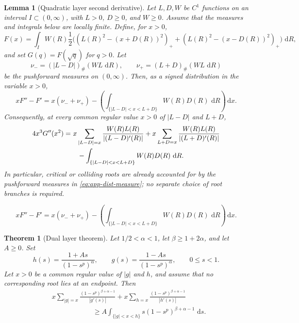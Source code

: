 \documentclass[10pt,a4paper]{amsart}
\newtheorem{theorem}{Theorem}
\newtheorem{lemma}{Lemma}
\newcommand{\dd}{\,\mathrm{d}}
\begin{document}
\begin{lemma}[Quadratic layer second derivative]\label{lem:app-second-dist}
Let $L,D,W$ be $C^1$ functions on an interval
$I\subset(0,\infty)$, with $L>0$, $D\ge0$, and $W\ge0$. Assume that
the measures and integrals below are locally finite. Define, for $x>0$,
\[
 F(x)=\int_I W(R)\frac12\Big(
 (L(R)^2-(x+D(R))^2)_+
 +(L(R)^2-(x-D(R))^2)_+
 \Big)\,\dd R,
\]
and set $G(q)=F(\sqrt q)$ for $q>0$. Let
\[
 \nu_-=(|L-D|)_\#(W L\,\dd R),
 \qquad
 \nu_+=(L+D)_\#(W L\,\dd R)
\]
be the pushforward measures on $(0,\infty)$. Then, as a signed
distribution in the variable $x>0$,
\begin{equation}\label{eq:app-dist-measure}
 xF''-F'
 =
 x(\nu_-+\nu_+)
 -
 \left(
 \int_{\{|L-D|<x<L+D\}}W(R)D(R)\,\dd R
 \right)\dd x.
\end{equation}
Consequently, at every common regular value $x>0$ of $|L-D|$ and
$L+D$,
\begin{align}\label{eq:app-dist-lemma}
4x^3G''(x^2)=&\
 x\sum_{|L-D|=x}\frac{W(R)L(R)}{|(L-D)'(R)|}
 +x\sum_{L+D=x}\frac{W(R)L(R)}{|(L+D)'(R)|}\notag\\
&\quad
 -\int_{\{|L-D|<x<L+D\}}W(R)D(R)\,\dd R.
\end{align}
In particular, critical or colliding roots are already accounted for
by the pushforward measures in \eqref{eq:app-dist-measure}; no
separate choice of root branches is required.
\end{lemma}

\begin{equation}
 xF''-F'
 =
 x(\nu_-+\nu_+)
 -
 \left(
 \int_{\{|L-D|<x<L+D\}}W(R)D(R)\,\dd R
 \right)\dd x.
\end{equation}

\begin{theorem}[Dual layer theorem]\label{thm:app-dlt}
Let $1/2<\alpha<1$, let $\beta\ge1+2\alpha$, and let $A\ge0$. Set
\[
 h(s)=\frac{1+As}{(1-s^p)^\alpha},
 \qquad
 g(s)=\frac{1-As}{(1-s^p)^\alpha},
 \qquad 0\le s<1.
\]
Let $x>0$ be a common regular value of $|g|$ and $h$, and assume
that no corresponding root lies at an endpoint. Then
\begin{align}\label{eq:app-dlt}
 &x\sum_{|g|=x}\frac{(1-s^p)^{\beta+\alpha-1}}{|g'(s)|}
 +x\sum_{h=x}\frac{(1-s^p)^{\beta+\alpha-1}}{|h'(s)|} \\
 &\hspace{1in}\ge
 A\int_{\{|g|<x<h\}}s(1-s^p)^{\beta+\alpha-1}\,\dd s.
\end{align}
\end{theorem}
\end{document}
